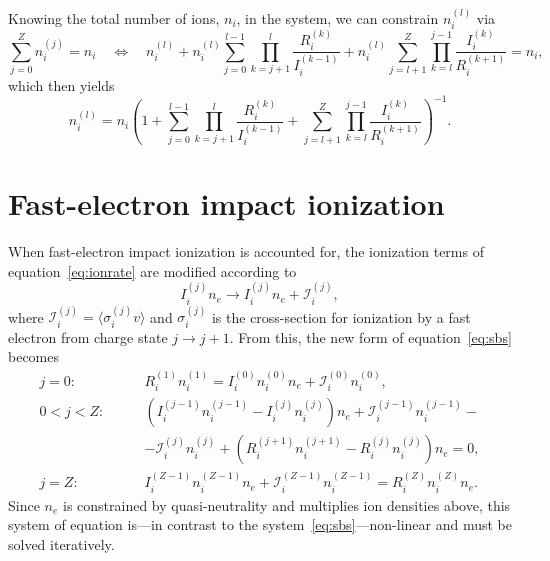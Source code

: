 \documentclass{notes}
\begin{document}
	Knowing the total number of ions, $n_i$, in the system, we can constrain
	$n_i^{(l)}$ via
	\begin{equation}
		\sum_{j=0}^Z n_i^{(j)} = n_i
		\quad\Longleftrightarrow\quad
		n_i^{(l)} +
		n_i^{(l)}\sum_{j=0}^{l-1}\prod_{k=j+1}^l\frac{R_i^{(k)}}{I_i^{(k-1)}} +
		n_i^{(l)}\sum_{j=l+1}^Z\prod_{k=l}^{j-1}\frac{I_i^{(k)}}{R_i^{(k+1)}} =
		n_i,
	\end{equation}
	which then yields
	\begin{equation}
		n_i^{(l)} = n_i\left(
			1+
			\sum_{j=0}^{l-1}\prod_{k=j+1}^{l}\frac{R_i^{(k)}}{I_i^{(k-1)}} +
			\sum_{j=l+1}^Z\prod_{k=l}^{j-1}\frac{I_i^{(k)}}{R_i^{(k+1)}}
		\right)^{-1}.
	\end{equation}

	\section*{Fast-electron impact ionization}
	When fast-electron impact ionization is accounted for, the ionization terms
	of equation~\eqref{eq:ionrate} are modified according to
	\begin{equation}
		I_i^{(j)}n_e \to I_i^{(j)}n_e + \mathcal{I}_i^{(j)},
	\end{equation}
	where $\mathcal{I}_i^{(j)}=\langle\sigma_i^{(j)}v\rangle$ and
	$\sigma_i^{(j)}$ is the cross-section for ionization by a fast electron from
	charge state $j\to j+1$. From this, the new form of equation~\eqref{eq:sbs}
	becomes
	\begin{equation}
		\begin{aligned}
			j=0:\qquad & R_i^{(1)}n_i^{(1)} = I_i^{(0)}n_i^{(0)}n_e + \mathcal{I}_i^{(0)}n_i^{(0)},\\
			0<j<Z:\qquad & \left(I_i^{(j-1)}n_i^{(j-1)} - I_i^{(j)}n_i^{(j)}\right)n_e +
				\mathcal{I}_i^{(j-1)}n_i^{(j-1)}-\\
				&-\mathcal{I}_i^{(j)}n_i^{(j)} +
				\left(R_i^{(j+1)}n_i^{(j+1)} - R_i^{(j)}n_i^{(j)}\right)n_e = 0,\\
			j=Z:\qquad & I_i^{(Z-1)}n_i^{(Z-1)}n_e + \mathcal{I}_i^{(Z-1)}n_i^{(Z-1)} = R_i^{(Z)}n_i^{(Z)}n_e.
		\end{aligned}
	\end{equation}
	Since $n_e$ is constrained by quasi-neutrality and multiplies ion densities
	above, this system of equation is---in contrast to the
	system~\eqref{eq:sbs}---non-linear and must be solved iteratively.
\end{document}
